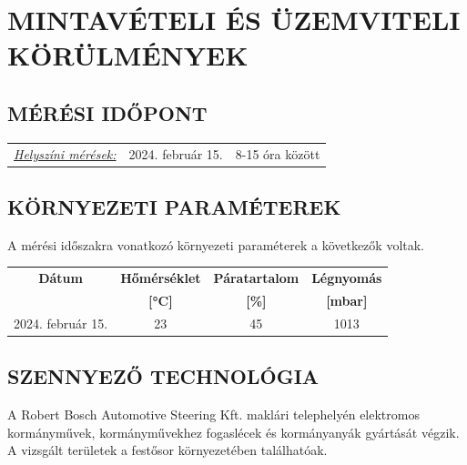 \documentclass[a4paper,12pt]{article}
\renewcommand{\arraystretch}{0.5}
\begin{document}

	\newpage  %
	\section{MINTAVÉTELI ÉS ÜZEMVITELI KÖRÜLMÉNYEK}
	\subsection{MÉRÉSI IDŐPONT}
		\begin{adjustwidth}{1cm}{0cm}
			\begin{tabular}{ p{5.5cm} p{4cm} p{5cm}}
				\textit{\underline{Helyszíni mérések:}} & 2024. február 15. & 8-15 óra között \\
			\end{tabular}
			
		\end{adjustwidth}
	
	
	

	\subsection{KÖRNYEZETI PARAMÉTEREK}
		\begin{adjustwidth}{1cm}{0cm}
			A mérési időszakra vonatkozó környezeti paraméterek a következők voltak. \\
			\begin{table}[h]
				\centering
				\renewcommand{\arraystretch}{1.5}
				\begin{tabular}{|c|c|c|c|}
					\hline
					\textbf{Dátum} & \multicolumn{1}{c|}{\textbf{Hőmérséklet}} & \multicolumn{1}{c|}{\textbf{Páratartalom}} & \multicolumn{1}{c|}{\textbf{Légnyomás}} \\
					& \textbf{[°C]} & \textbf{[\%]} & \textbf{[mbar]} \\
					\hline
					2024. február 15. & 23 & 45 & 1013 \\
					\hline
				\end{tabular}\label{tab:table}
			\end{table}
			
			
		\end{adjustwidth}
	
	\subsection{SZENNYEZŐ TECHNOLÓGIA}
		\begin{adjustwidth}{1cm}{0cm}
			A Robert Bosch Automotive Steering Kft. maklári telephelyén elektromos kormányművek,
kormányművekhez fogaslécek és kormányanyák gyártását végzik. A vizsgált területek a
festősor környezetében találhatóak.
		\end{adjustwidth}
	
\end{document}

